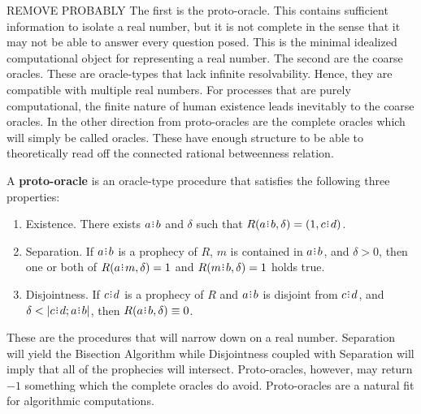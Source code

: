 \documentclass[12pt]{article}
\begin{document}
REMOVE PROBABLY The first is the proto-oracle. This contains sufficient information to isolate a real number, but it is not complete in the sense that it may not be able to answer every question posed. This is the minimal idealized computational object for representing a real number. The second are the coarse oracles. These are oracle-types that lack infinite resolvability. Hence, they are compatible with multiple real numbers. For processes that are purely computational, the finite nature of human existence leads inevitably to the coarse oracles. In the other direction from proto-oracles are the complete oracles which will simply be called oracles. These have enough structure to be able to theoretically read off the connected rational betweenness relation. 

A \textbf{proto-oracle} is an oracle-type procedure that satisfies the following three properties: 
\begin{enumerate}
    \item Existence. There exists $a \rint b$ and $\delta$ such that $R(a \rint b, \delta) = (1, c\rint d)$. 
    \item Separation. If $a\rint b$ is a prophecy of $R$, $m$ is contained in $a\rint b$, and $\delta > 0$, then one or both of $R(a \rint m, \delta) =1$  and $R(m \rint b, \delta) = 1$ holds true. 
   \item Disjointness. 
   If $c\rint d$ is a prophecy of $R$ and $a\rint b$ is disjoint from $c\rint d$, and $\delta < |c \rint d; a\rint b|$, then $R(a\rint b, \delta) \equiv 0$.
\end{enumerate}
These are the procedures that will narrow down on a real number. Separation will yield the Bisection Algorithm while Disjointness coupled with Separation will imply that all of the prophecies will intersect. Proto-oracles, however, may return $-1$ something which the complete oracles do avoid. Proto-oracles are a natural fit for algorithmic computations. 
\end{document}
